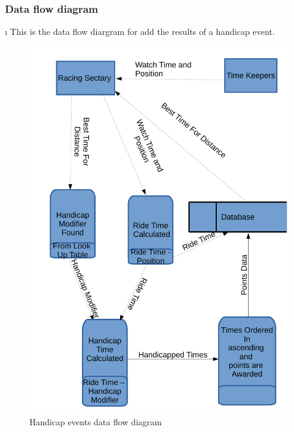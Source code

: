 \subsubsection{Data flow diagram}\i
This is the data flow diargram for add the results of a handicap event.
\begin{figure}[H]
    \includegraphics[width=\textwidth]{./HandicapDFD.pdf}
    \caption{Handicap events data flow diagram} \label{fig:Handicap_even_DFD}
\end{figure}

